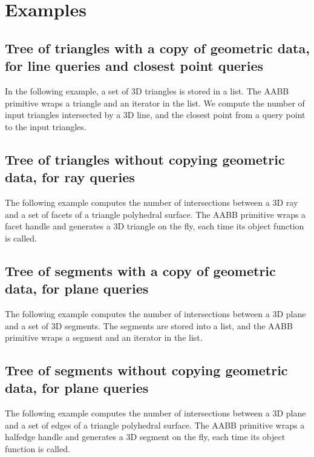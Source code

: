 \section{Examples}
\label{AABB_tree_section_examples}

\subsection{Tree of triangles with a copy of geometric data, for line queries and closest point queries}
In the following example, a set of 3D triangles is stored in a list. The AABB primitive wraps a triangle and an iterator in the list. We compute the number of input triangles intersected by a 3D line, and the closest point from a query point to the input triangles.

\subsection{Tree of triangles without copying geometric data, for ray queries}
The following example computes the number of intersections between a 3D ray and a set of facets of a triangle polyhedral surface. The AABB primitive wraps a facet handle and generates a 3D triangle on the fly, each time its object function is called.

\subsection{Tree of segments with a copy of geometric data, for plane queries}
The following example computes the number of intersections between a 3D plane and a set of 3D segments. The segments are stored into a list, and the AABB primitive wraps a segment and an iterator in the list.

\subsection{Tree of segments without copying geometric data, for plane queries}
The following example computes the number of intersections between a 3D plane and a set of edges of a triangle polyhedral surface. The AABB primitive wraps a halfedge handle and generates a 3D segment on the fly, each time its object function is called.
